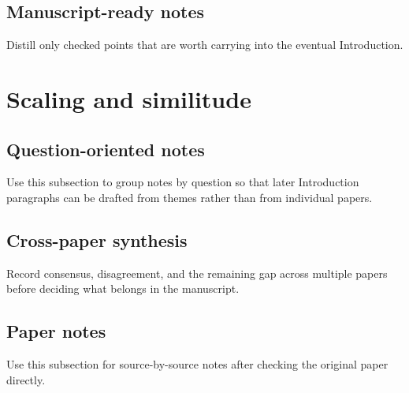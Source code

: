 \documentclass[11pt]{article}
\begin{document}
\subsection{Manuscript-ready notes}
Distill only checked points that are worth carrying into the eventual Introduction.

\section{Scaling and similitude}

\subsection{Question-oriented notes}
Use this subsection to group notes by question so that later Introduction paragraphs can be drafted from themes rather than from individual papers.

\subsection{Cross-paper synthesis}
Record consensus, disagreement, and the remaining gap across multiple papers before deciding what belongs in the manuscript.

\subsection{Paper notes}
Use this subsection for source-by-source notes after checking the original paper directly.
%
\end{document}
